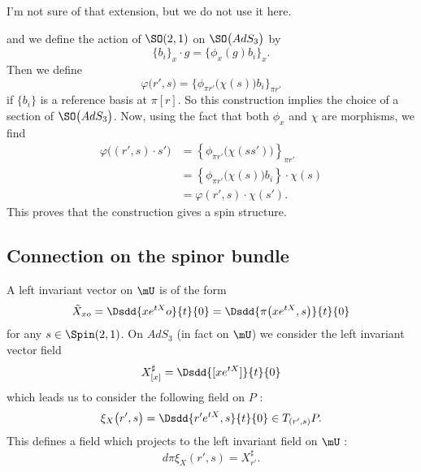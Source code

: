 \begin{probleme}
    I'm not sure of that extension, but we do not use it here.
\end{probleme}


and we define the action of $\SO(2,1)$ on $\SO\big( AdS_3 \big)$ by
\begin{equation}
\{ b_{i} \}_{x}\cdot g=\{ \phi_{x}(g)b_{i} \}_{x}.
\end{equation}
Then we define
\begin{equation}
  \varphi\big( r',s \big)=\{ \phi_{\pi r'}\big( \chi(s) \big)b_{i} \}_{\pi r'}
\end{equation}
 if $\{ b_{i} \}$ is a reference basis at $\pi[r]$. So this construction implies the choice of a section of $\SO\big( AdS_3 \big)$. Now, using the fact that both $\phi_{x}$ and $\chi$ are morphisms, we find 
\begin{equation}
\begin{split}
\varphi\big( (r',s)\cdot s' \big)&=\left\{ \phi_{\pi r'}\big( \chi(ss') \big) \right\}_{\pi r'}\\
            &=\left\{ \phi_{\pi r'}\big( \chi(s) \big)b_{i} \right\}\cdot\chi(s)\\
            &=\varphi(r',s)\cdot\chi(s').
\end{split}
\end{equation}
This proves that the construction gives a spin structure.

\subsection{Connection on the spinor bundle}

A left invariant vector on $\mU$ is of the form
\[ 
  \tilde X_{xo}=\Dsdd{ x e^{tX}o }{t}{0}
        =\Dsdd{ \pi\big( x e^{tX},s \big) }{t}{0}
\]
for any $s\in\Spin(2,1)$. On $AdS_3$ (in fact on $\mU$) we consider the left invariant vector field
\begin{equation}
X^{\sharp}_{[x]}=\Dsdd{ [x e^{tX}] }{t}{0}
\end{equation}
which leads us to consider the following field on $P$ :
\begin{equation}
\xi_{X}\big( r',s \big)=\Dsdd{ r' e^{tX},s }{t}{0}\in T_{( r',s )}P.
\end{equation}
This defines a field which projects to the left invariant field on $\mU$ :
\begin{equation}   \label{eq_xiXprojXsharp}
d\pi\xi_{X}(r',s)=X^{\sharp}_{r'}.
\end{equation}  


